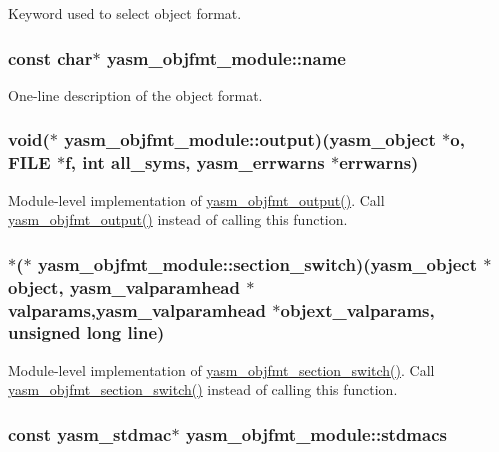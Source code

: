 Keyword used to select object format. \hypertarget{structyasm__objfmt__module_a8680345e00c1f5f0141aa3d2b9e30b26}{
\subsubsection[{name}]{\setlength{\rightskip}{0pt plus 5cm}const char$\ast$ yasm\-\_\-objfmt\-\_\-module\-::name}}\label{structyasm__objfmt__module_a8680345e00c1f5f0141aa3d2b9e30b26}
One-\/line description of the object format. \hypertarget{structyasm__objfmt__module_a5dbccfd2eba95930b2feff7a100c0fd4}{
\subsubsection[{output}]{\setlength{\rightskip}{0pt plus 5cm}void($\ast$ yasm\-\_\-objfmt\-\_\-module\-::output)({\bf yasm\-\_\-object} $\ast$o, F\-I\-L\-E $\ast$f, int all\-\_\-syms, {\bf yasm\-\_\-errwarns} $\ast$errwarns)}}\label{structyasm__objfmt__module_a5dbccfd2eba95930b2feff7a100c0fd4}
Module-\/level implementation of \hyperlink{objfmt_8h_a006e2f7c6f7f7492431782f2d0a4e42e}{yasm\-\_\-objfmt\-\_\-output()}. Call \hyperlink{objfmt_8h_a006e2f7c6f7f7492431782f2d0a4e42e}{yasm\-\_\-objfmt\-\_\-output()} instead of calling this function. \hypertarget{structyasm__objfmt__module_ac6eebfbcfe1999d7815ab6b0b624c377}{
\subsubsection[{section\-\_\-switch}]{$\ast$($\ast$ yasm\-\_\-objfmt\-\_\-module\-::section\-\_\-switch)({\bf yasm\-\_\-object} $\ast$object, {\bf yasm\-\_\-valparamhead} $\ast$valparams,{\bf yasm\-\_\-valparamhead} $\ast$objext\-\_\-valparams, unsigned long line)}}\label{structyasm__objfmt__module_ac6eebfbcfe1999d7815ab6b0b624c377}
Module-\/level implementation of \hyperlink{objfmt_8h_a3bfaf475ae96a95a959caf5d376cff16}{yasm\-\_\-objfmt\-\_\-section\-\_\-switch()}. Call \hyperlink{objfmt_8h_a3bfaf475ae96a95a959caf5d376cff16}{yasm\-\_\-objfmt\-\_\-section\-\_\-switch()} instead of calling this function. \hypertarget{structyasm__objfmt__module_a7786fbe1bf26e94e025f73422b4571ac}{
\subsubsection[{stdmacs}]{\setlength{\rightskip}{0pt plus 5cm}const {\bf yasm\-\_\-stdmac}$\ast$ yasm\-\_\-objfmt\-\_\-module\-::stdmacs}}\label{structyasm__objfmt__module_a7786fbe1bf26e94e025f73422b4571ac}

